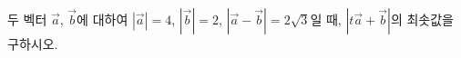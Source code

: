 두 벡터 $\vec{a}$, $\vec{b}$에 대하여 $|\vec{a}|=4$, $|\vec{b}|=2$, $|\vec{a}-\vec{b}|=2\sqrt{3}$일 때, $|t\vec{a}+\vec{b}|$의 최솟값을 구하시오. 
